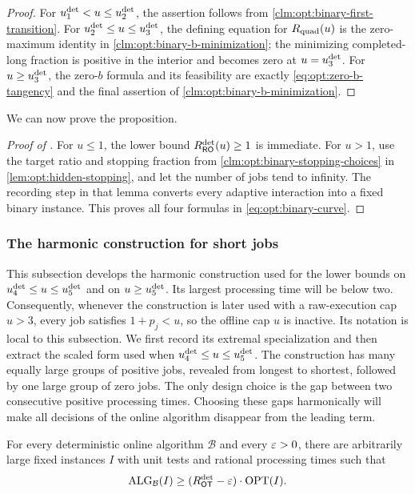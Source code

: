 \begin{proof}
For $u_{1}^{\mathrm{det}}<u\le u_{2}^{\mathrm{det}}$, the assertion follows from
\cref{clm:opt:binary-first-transition}.  For
$u_{2}^{\mathrm{det}}\le u\le u_{3}^{\mathrm{det}}$, the defining equation for $R_{\mathrm{quad}}(u)$ is the
zero-maximum identity in
\cref{clm:opt:binary-b-minimization}; the minimizing completed-long fraction
is positive in the interior and becomes zero at $u=u_{3}^{\mathrm{det}}$.  For
$u\ge u_{3}^{\mathrm{det}}$, the zero-$b$ formula and its feasibility are exactly
\cref{eq:opt:zero-b-tangency} and the final assertion of
\cref{clm:opt:binary-b-minimization}.
\end{proof}

We can now prove the proposition.

\begin{proof}[Proof of ]
For $u\le1$, the lower bound $R_{\mathsf{RO}}^{\mathrm{det}}(u)\ge1$ is immediate.  For $u>1$,
use the target ratio and stopping fraction from
\cref{clm:opt:binary-stopping-choices} in
\cref{lem:opt:hidden-stopping}, and let the number of jobs tend to infinity.
The recording step in that lemma converts every adaptive interaction into a
fixed binary instance.  This proves all four formulas in
\cref{eq:opt:binary-curve}.
\end{proof}


\subsubsection{The harmonic construction for short jobs}
\label{sec:lower}

This subsection develops the harmonic construction used for the lower bounds
on $u_{4}^{\mathrm{det}}\le u\le u_{5}^{\mathrm{det}}$ and on $u\ge u_{5}^{\mathrm{det}}$.  Its largest
processing time will be below two.  Consequently, whenever the construction
is later used with a
raw-execution cap $u>3$, every job satisfies $1+p_j<u$, so the offline cap
$u$ is inactive.
Its notation is local to this subsection.
We first record its extremal specialization and then extract the scaled form
used when $u_{4}^{\mathrm{det}}\le u\le u_{5}^{\mathrm{det}}$.  The construction
has many equally large groups of positive jobs, revealed from longest to
shortest, followed by one large group of zero jobs.  The only design choice is
the gap between two consecutive positive processing times.  Choosing these
gaps harmonically will make all decisions of the online algorithm disappear
from the leading term.

\begin{theorem}
\label{thm:lower}
For every deterministic online algorithm $\mathcal B$ and every $\varepsilon>0$,
there are arbitrarily large fixed instances $I$ with unit tests and rational
processing times such that
\[
  \operatorname{ALG}_{\mathcal B}(I)\ge (R_{\mathsf{OT}}^{\mathrm{det}}-\varepsilon)\cdot\operatorname{OPT}(I).
\]
\end{theorem}

